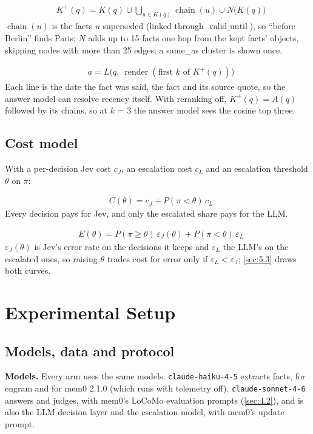 \documentclass[11pt]{article}
\newcommand{\src}[1]{}
\begin{document}
\begin{align}
& K^{+}(q) = K(q) \cup \textstyle\bigcup_{u \in K(q)} \operatorname{chain}(u) \cup N\bigl(K(q)\bigr) \label{eq:hist}
\end{align}
$\operatorname{chain}(u)$ is the facts $u$ superseded (linked through $\operatorname{valid\_until}$), so ``before Berlin'' finds Paris; $N$ adds up to 15\src{src/engram/pipeline/retrieve.py (MAX\_EXPANDED)} facts one hop from the kept facts' objects, skipping nodes with more than 25\src{src/engram/pipeline/retrieve.py (HUB\_DEGREE)} edges; a same\_as cluster is shown once.

\begin{align}
& a = L\bigl(q,\ \operatorname{render}(\text{first } k \text{ of } K^{+}(q))\bigr) \label{eq:answer}
\end{align}
Each line is the date the fact was said, the fact and its source quote, so the answer model can resolve recency itself. With reranking off, $K^{+}(q) = A(q)$ followed by its chains, so at $k$ = 3 the answer model sees the cosine top three.

\subsection{Cost model}\label{sec:3.4}
With a per-decision Jev cost $c_J$, an escalation cost $c_L$ and an escalation threshold $\theta$ on $\pi$:

\begin{align}
& C(\theta) = c_J + P(\pi < \theta)\, c_L \label{eq:cost}
\end{align}
Every decision pays for Jev, and only the escalated share pays for the LLM.

\begin{align}
& E(\theta) = P(\pi \ge \theta)\, \varepsilon_J(\theta) + P(\pi < \theta)\, \varepsilon_L \label{eq:error}
\end{align}
$\varepsilon_J(\theta)$ is Jev's error rate on the decisions it keeps and $\varepsilon_L$ the LLM's on the escalated ones, so raising $\theta$ trades cost for error only if $\varepsilon_L < \varepsilon_J$; \cref{sec:5.3} draws both curves.

\section{Experimental Setup}\label{sec:4}
\subsection{Models, data and protocol}\label{sec:4.1}
\textbf{Models.} Every arm uses the same models. \texttt{claude-haiku-4-5} extracts facts, for engram and for mem0 2.1.0 (which runs with telemetry off). \texttt{claude-sonnet-4-6} answers and judges, with mem0's LoCoMo evaluation prompts (\cref{sec:4.2}), and is also the LLM decision layer and the escalation model, with mem0's update prompt.
\end{document}
